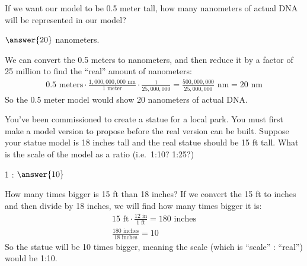 \documentclass[12pt]{ximera}
\begin{document}
\begin{problem}
If we want our model to be 0.5 meter tall, how many nanometers of actual DNA will be
represented in our model?

$\answer{20}$ nanometers.

\begin{solution}
We can convert the 0.5 meters to nanometers, and then reduce it by a factor of 25
million to find the ``real'' amount of nanometers:
\begin{gather*}
0.5\text{ meters} \cdot \frac{1{,}000{,}000{,}000\text{ nm}}{1\text{ meter}} \cdot \frac{1}{25{,}000{,}000}
= \frac{500{,}000{,}000}{25{,}000{,}000}\text{ nm} = 20\text{ nm}
\end{gather*}
So the 0.5 meter model would show 20 nanometers of actual DNA.
\end{solution}
\end{problem}

\begin{problem}
You've been commissioned to create a statue for a local park. You must first make a
model version to propose before the real version can be built. Suppose your statue
model is 18 inches tall and the real statue should be 15 ft tall. What is the scale of
the model as a ratio (i.e.\ 1:10? 1:25?)

1 : $\answer{10}$

\begin{solution}
How many times bigger is 15 ft than 18 inches? If we convert the 15 ft to inches and
then divide by 18 inches, we will find how many times bigger it is:
\begin{gather*}
15\text{ ft} \cdot \frac{12\text{ in}}{1\text{ ft}} = 180\text{ inches} \\
\frac{180\text{ inches}}{18\text{ inches}} = 10
\end{gather*}
So the statue will be 10 times bigger, meaning the scale (which is ``scale'' : ``real'')
would be 1:10.
\end{solution}
\end{problem}
\end{document}
